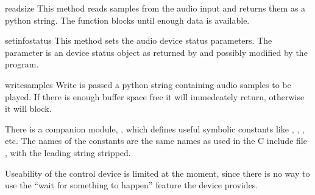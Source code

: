 \begin{funcdesc}{read}{size}
This method reads  samples from the audio input and returns
them as a python string. The function blocks until enough data is available.
\end{funcdesc}

\begin{funcdesc}{setinfo}{status}
This method sets the audio device status parameters. The 
parameter is an device status object as returned by  and
possibly modified by the program.
\end{funcdesc}

\begin{funcdesc}{write}{samples}
Write is passed a python string containing audio samples to be played.
If there is enough buffer space free it will immedeately return,
otherwise it will block.
\end{funcdesc}

There is a companion module, , which defines useful
symbolic constants like , ,
, etc. The names of
the constants are the same names as used in the C include file
, with the leading string  stripped.

Useability of the control device is limited at the moment, since there
is no way to use the ``wait for something to happen'' feature the
device provides.
